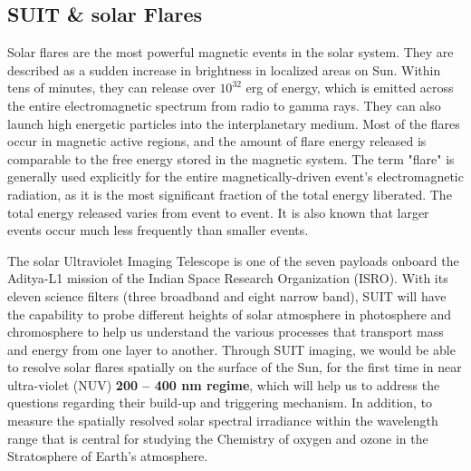 \subsection{SUIT \& solar Flares}\label{sec:suit_and_flare}

Solar flares are the most powerful magnetic events in the solar system. They are described as a sudden increase in brightness in localized areas on Sun. Within tens of minutes, they can release over $10^{32}$ erg of energy, which is emitted across the entire electromagnetic spectrum from radio to gamma rays. They can also launch high energetic particles into the interplanetary medium. Most of the flares occur in magnetic active regions, and the amount of flare energy released is comparable to the free energy stored in the magnetic system. The term "flare" is generally used explicitly for the entire magnetically-driven event's electromagnetic radiation, as it is the most significant fraction of the total energy liberated. The total energy released varies from event to event. It is also known that larger events occur much less frequently than smaller events.

The solar Ultraviolet Imaging Telescope \citep[SUIT;][]{ghosh16,article} is one of the seven payloads onboard the Aditya-L1 mission \citep{adityal1} of the Indian Space Research Organization (ISRO). With its eleven science filters (three broadband and eight narrow band), SUIT will have the capability to probe different heights of solar atmosphere in photosphere and chromosphere to help us understand the various processes that transport mass and energy from one layer to another. Through SUIT imaging, we would be able to resolve solar flares spatially on the surface of the Sun, for the first time in near ultra-violet (NUV) {\bf 200 {-- 400} nm regime}, which will help us to address the questions regarding their build-up and triggering mechanism. In addition, to measure the spatially resolved solar spectral irradiance within the wavelength range that is central for studying the Chemistry of oxygen and ozone in the Stratosphere of Earth's atmosphere.

